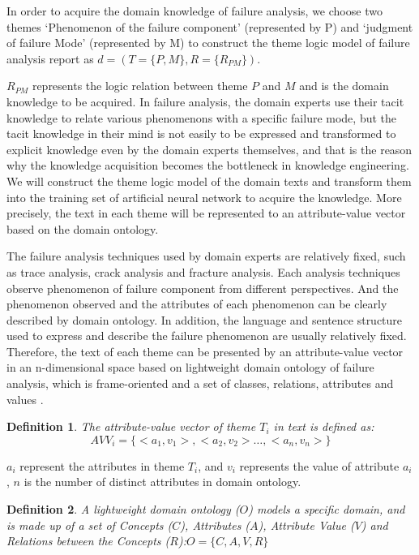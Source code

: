 \documentclass{elsarticle}
\newtheorem{definition}{Definition}
\begin{document}
In order to acquire the domain knowledge of failure analysis, we
choose two themes ‘Phenomenon of the failure component’ (represented
by P) and ‘judgment of failure Mode’ (represented by M) to construct
the theme logic model of failure analysis report as $d = (T = \{P,M\},
R = \{R_{PM}\})$.

$R_{PM}$ represents the logic relation between theme $P$ and $M$ and
is the domain knowledge to be acquired. In failure analysis, the
domain experts use their tacit knowledge to relate various phenomenons
with a specific failure mode, but the tacit knowledge in their mind is
not easily to be expressed and transformed to explicit knowledge even
by the domain experts themselves, and that is the reason why the
knowledge acquisition becomes the bottleneck in knowledge
engineering. We will construct the theme logic model of the domain
texts and transform them into the training set of artificial neural
network to acquire the knowledge. More precisely, the text in each
theme will be represented to an attribute-value vector based on the
domain ontology. 

The failure analysis techniques used by domain experts are relatively
fixed, such as trace analysis, crack analysis and fracture
analysis. Each analysis techniques observe phenomenon of failure
component from different perspectives. And the phenomenon observed and
the attributes of each phenomenon can be clearly described by domain
ontology. In addition, the language and sentence structure used to express and describe the failure phenomenon are usually relatively fixed. Therefore, the text of each theme can be presented by an attribute-value vector in an n-dimensional space based on lightweight domain ontology of failure analysis, which is frame-oriented and a set of classes, relations, attributes and values \cite{747902}.

\begin{definition}
  The attribute-value vector of theme $T_i$ in text is defined as:
\[AVV_i = \{<a_1,v_1>,<a_2,v_2> \ldots,<a_n,v_n>\} \]
\end{definition}
$a_i$ represent the attributes in theme $T_i$, and $v_i$ represents the value of attribute $a_i$ , $n$ is the number of distinct attributes in domain ontology.

\begin{definition}
  A lightweight domain ontology ($O$) models a specific domain, and is
  made up of a set of Concepts ($C$), Attributes ($A$), Attribute
  Value ($V$) and Relations between the Concepts ($R$):$O = \{C,A,V,R\}$


\end{definition}
\end{document}
